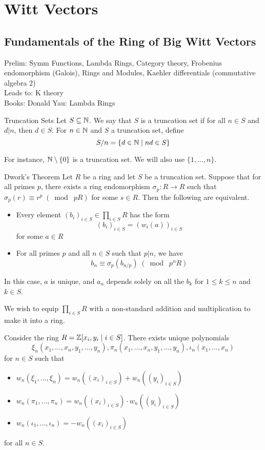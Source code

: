 \documentclass[a4paper]{article}
\begin{document}
\pagebreak
\section{Witt Vectors}
\subsection{Fundamentals of the Ring of Big Witt Vectors}
Prelim: Symm Functions, Lambda Rings, Category theory, Frobenius endomorphism (Galois), Rings and Modules, Kaehler differentials (commutative algebra 2)\\
Leads to: K theory\\
Books: Donald Yau: Lambda Rings

\begin{defn}{Truncation Sets}{} Let $S\subseteq\mathbb{N}$. We say that $S$ is a truncation set if for all $n\in S$ and $d|n$, then $d\in S$. For $n\in\mathbb{N}$ and $S$ a truncation set, define $$S/n=\{d\in\mathbb{N}\;|\;nd\in S\}$$
\end{defn}

For instance, $\mathbb{N}\setminus\{0\}$ is a truncation set. We will also use $\{1,\dots,n\}$. 

\begin{thm}{Dwork's Theorem}{} Let $R$ be a ring and let $S$ be a truncation set. Suppose that for all primes $p$, there exists a ring endomorphism $\sigma_p:R\to R$ such that $\sigma_p(r)\equiv r^p\;(\bmod\;pR)$ for some $s\in R$. Then the following are equivalent. 
\begin{itemize}
\item Every element $(b_i)_{i\in S}\in\prod_{i\in S} R$ has the form $$(b_i)_{i\in S}=(w_i(a))_{i\in S}$$ for some $a\in R$
\item For all primes $p$ and all $n\in S$ such that $p|n$, we have $$b_n\equiv\sigma_p(b_{n/p})\;(\bmod\;p^nR)$$ 
\end{itemize}
In this case, $a$ is unique, and $a_n$ depends solely on all the $b_k$ for $1\leq k\leq n$ and $k\in S$. 
\end{thm}

We wish to equip $\prod_{i\in S}R$ with a non-standard addition and multiplication to make it into a ring. 

\begin{prp}{}{} Consider the ring $R=\mathbb{Z}[x_i,y_i\;|\;i\in S]$. There exists unique polynomials $$\xi_n(x_1,\dots,x_n,y_1,\dots,y_n), \pi_n(x_1,\dots,x_n,y_1,\dots,y_n),\iota_n(x_1,\dots,x_n)$$ for $n\in S$ such that 
\begin{itemize}
\item $w_n(\xi_1,\dots,\xi_n)=w_n((x_i)_{i\in S})+w_n((y_i)_{i\in S})$
\item $w_n(\pi_1,\dots,\pi_n)=w_n((x_i)_{i\in S})\cdot w_n((y_i)_{i\in S})$
\item $w_n(\iota_1,\dots,\iota_n)=-w_n((x_i)_{i\in S})$
\end{itemize}
for all $n\in S$. 
\end{prp}
\end{document}
